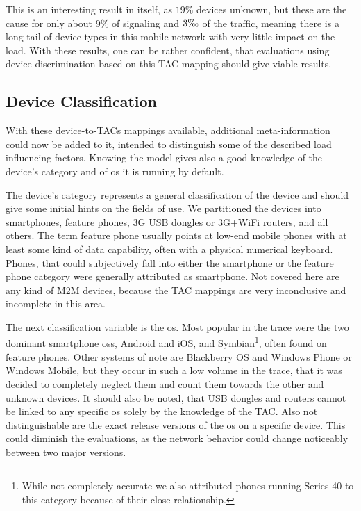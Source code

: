 This is an interesting result in itself, as $19\%$ devices unknown, but these are the cause for only about $9\%$ of signaling and $3\text{\textperthousand}$ of the traffic, meaning there is a long tail of device types in this mobile network with very little impact on the load. With these results, one can be rather confident, that evaluations using device discrimination based on this \gls{TAC} mapping should give viable results.


\subsection{Device Classification}

With these device-to-\glspl{TAC} mappings available, additional meta-information could now be added to it, intended to distinguish some of the described load influencing factors. Knowing the model gives also a good knowledge of the device's category and of \gls{os} it is running by default.

The device's category represents a general classification of the device and should give some initial hints on the fields of use. We partitioned the devices into smartphones, feature phones, \gls{3G} USB dongles or \gls{3G}+WiFi routers, and all others. The term feature phone usually points at low-end mobile phones with at least some kind of data capability, often with a physical numerical keyboard. Phones, that could subjectively fall into either the smartphone or the feature phone category were generally attributed as smartphone. Not covered here are any kind of \gls{M2M} devices, because the \gls{TAC} mappings are very inconclusive and incomplete in this area.

The next classification variable is the \gls{os}. Most popular in the trace were the two dominant smartphone \glspl{os}, Android and iOS, and Symbian\footnote{While not completely accurate we also attributed phones running Series 40 to this category because of their close relationship.}, often found on feature phones. Other systems of note are Blackberry OS and Windows Phone or Windows Mobile, but they occur in such a low volume in the trace, that it was decided to completely neglect them and count them towards the other and unknown devices. It should also be noted, that USB dongles and routers cannot be linked to any specific \gls{os} solely by the knowledge of the \gls{TAC}. Also not distinguishable are the exact release versions of the \gls{os} on a specific device. This could diminish the evaluations, as the network behavior could change noticeably between two major versions.

